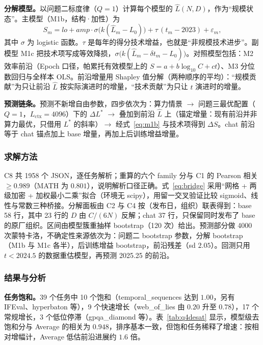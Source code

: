 \textbf{分解模型。}以问题二标度律（$Q=1$）计算每个模型的 $\hat L(N,D)$，作为“规模状态”。主模型（M1b，结构·加性）为
\begin{equation}
S_m=lo+amp\cdot\sigma\bigl(k(\hat L_m-L_0)\bigr)+\tau\,(t_m-2023)+\varepsilon_m,
\label{eq:m1b}
\end{equation}
其中 $\sigma$ 为 logistic 函数。$\tau$ 是每年的得分技术增益，也就是“非规模技术进步”。副模型 M1c 把技术项写成等效降损，$\sigma\bigl(k(\hat L_m-\delta t_m-L_0)\bigr)$。对照模型包括：M2 效率前沿（Epoch 口径，帕累托有效模型上的 $S=a+b\log_{10}C+ct$）、M3 分位数回归与全样本 OLS。前沿增量用 Shapley 值分解（两种顺序的平均）：“规模贡献”为只让前沿 $\hat L$ 按实际演进时的增量，“技术贡献”为只让 $t$ 演进时的增量。

\textbf{预测链条。}预测不新增自由参数，四步依次为：算力情景 $\to$ 问题三最优配置（$Q=1$，$L_{\mathrm{ctx}}=4096$）下的 $\Delta L^*$ $\to$ 叠加到前沿 $\hat L$ 上（锚定增量：现有前沿并非算力最优，只借用 $L^*$ 的斜率）$\to$ 经式~\eqref{eq:m1b} 与技术项得到 $\Delta S$。chat 前沿等于 chat 锚点加上 base 增量，再加上后训练增益增量。

\subsubsection{求解方法}

C8 共 1958 个 JSON，逐任务解析；重算的六个 family 分与 C1 的 Pearson 相关 $\ge0.989$（MATH 为 $0.801$），说明解析口径正确。式~\eqref{eq:bridge} 采用“网格 + 两级加密 + 加权最小二乘”拟合（环境无 scipy），用留一交叉验证比较 sigmoid、线性与常数三种桥接。分解面板由 C2 与 C4 按（发布日，组织）联表得到：base 58 行，其中 23 行的 $D$ 由 $C/(6N)$ 反解；chat 37 行，只保留同时发布了 base 的原厂组织。区间由模型簇重抽样 bootstrap（120 次）给出。预测部分做 4000 次蒙特卡洛，不确定性来源依次为：问题二 bootstrap 参数，分解 bootstrap（M1b 与 M1c 各半），后训练增益 bootstrap，前沿残差（sd $2.05$）。回测只用 $t<2024.5$ 的数据重估模型，再预测 2025.25 的前沿。

\subsubsection{结果与分析}

\textbf{任务饱和。}39 个任务中 10 个饱和（temporal\_sequences 达到 $1.00$，另有 IFEval、hyperbaton 等），9 个快速增长（web\_of\_lies 由 $0.20$ 升至 $0.78$），17 个常规增长，3 个低位停滞（gpqa\_diamond 等）。表~\ref{tab:q4desat} 显示，模型级去饱和分与 Average 的相关为 $0.948$，排序基本一致，但饱和任务稀释了增速：按相对增幅计，Average 低估前沿进展约 $1.6$ 倍。

